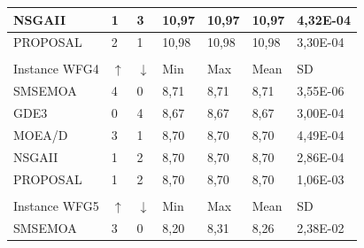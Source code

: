 \begin{table}[H]
\begin{scriptsize}
{\begin{tabular}{lllllll}
\multicolumn{1}{|l|}{NSGAII} & \multicolumn{1}{l|}{1} & \multicolumn{1}{l|}{3} & \multicolumn{1}{l|}{10,97} & \multicolumn{1}{l|}{10,97} & \multicolumn{1}{l|}{10,97} & \multicolumn{1}{l|}{4,32E-04} \\ \hline
\multicolumn{1}{|l|}{PROPOSAL} & \multicolumn{1}{l|}{2} & \multicolumn{1}{l|}{1} & \multicolumn{1}{l|}{10,98} & \multicolumn{1}{l|}{10,98} & \multicolumn{1}{l|}{10,98} & \multicolumn{1}{l|}{3,30E-04} \\ \hline
&  &  &  &  &  &  \\ \hline
\multicolumn{1}{|l|}{Instance WFG4} & \multicolumn{1}{l|}{$\uparrow$} & \multicolumn{1}{l|}{$\downarrow$} & \multicolumn{1}{l|}{Min} & \multicolumn{1}{l|}{Max} & \multicolumn{1}{l|}{Mean} & \multicolumn{1}{l|}{SD} \\ \hline
\multicolumn{1}{|l|}{SMSEMOA} & \multicolumn{1}{l|}{4} & \multicolumn{1}{l|}{0} & \multicolumn{1}{l|}{8,71} & \multicolumn{1}{l|}{8,71} & \multicolumn{1}{l|}{8,71} & \multicolumn{1}{l|}{3,55E-06} \\ \hline
\multicolumn{1}{|l|}{GDE3} & \multicolumn{1}{l|}{0} & \multicolumn{1}{l|}{4} & \multicolumn{1}{l|}{8,67} & \multicolumn{1}{l|}{8,67} & \multicolumn{1}{l|}{8,67} & \multicolumn{1}{l|}{3,00E-04} \\ \hline
\multicolumn{1}{|l|}{MOEA/D} & \multicolumn{1}{l|}{3} & \multicolumn{1}{l|}{1} & \multicolumn{1}{l|}{8,70} & \multicolumn{1}{l|}{8,70} & \multicolumn{1}{l|}{8,70} & \multicolumn{1}{l|}{4,49E-04} \\ \hline
\multicolumn{1}{|l|}{NSGAII} & \multicolumn{1}{l|}{1} & \multicolumn{1}{l|}{2} & \multicolumn{1}{l|}{8,70} & \multicolumn{1}{l|}{8,70} & \multicolumn{1}{l|}{8,70} & \multicolumn{1}{l|}{2,86E-04} \\ \hline
\multicolumn{1}{|l|}{PROPOSAL} & \multicolumn{1}{l|}{1} & \multicolumn{1}{l|}{2} & \multicolumn{1}{l|}{8,70} & \multicolumn{1}{l|}{8,70} & \multicolumn{1}{l|}{8,70} & \multicolumn{1}{l|}{1,06E-03} \\ \hline
 &  &  &  &  &  &  \\ \hline
\multicolumn{1}{|l|}{Instance WFG5} & \multicolumn{1}{l|}{$\uparrow$} & \multicolumn{1}{l|}{$\downarrow$} & \multicolumn{1}{l|}{Min} & \multicolumn{1}{l|}{Max} & \multicolumn{1}{l|}{Mean} & \multicolumn{1}{l|}{SD} \\ \hline
\multicolumn{1}{|l|}{SMSEMOA} & \multicolumn{1}{l|}{3} & \multicolumn{1}{l|}{0} & \multicolumn{1}{l|}{8,20} & \multicolumn{1}{l|}{8,31} & \multicolumn{1}{l|}{8,26} & \multicolumn{1}{l|}{2,38E-02} \\ \hline

\end{tabular}}
\end{scriptsize}
\end{table}
